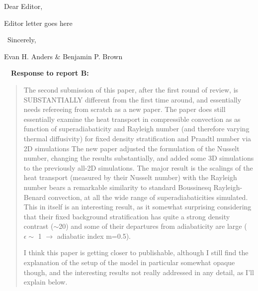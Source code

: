 \documentclass[aps, 11pt, singlecolumn]{revtex4-1} %
\begin{document}
\noindent
Dear Editor,
$\,$\newline

\newenvironment{myquotation}{
\begin{quotation}
\itshape
}{ 
\end{quotation}
}

\begin{singlespace}
Editor letter goes here

$\,$\newline
\noindent
Sincerely,

Evan H. Anders \& Benjamin P. Brown




$\,$
\newline
$\,$
\newline
\noindent
\Large{\textbf{Response to report B:}}\newline$\,$\newline\indent

\begin{myquotation}

The second submission of this paper, after the first round of review,
is SUBSTANTIALLY different from the first time around, and essentially
needs refereeing from scratch as a new paper. The paper does still
essentially examine the heat transport in compressible convection as
as function of superadiabaticity and Rayleigh number (and therefore
varying thermal diffusivity) for fixed density stratification and
Prandtl number via 2D simulations The new paper adjusted the
formulation of the Nusselt number, changing the results substantially,
and added some 3D simulations to the previously all-2D simulations.
The major result is the scalings of the heat transport (measured by
their Nusselt number) with the Rayleigh number bears a remarkable
similarity to standard Boussinesq Rayleigh-Benard convection, at all
the wide range of superadiabaticities simulated. This in itself is an
interesting result, as it somewhat surprising considering that their
fixed background stratification has quite a strong density contrast
($\sim$20) and some of their departures from adiabaticity are large
($\epsilon \sim$ 1 $\rightarrow$ adiabatic index m=0.5).

I think this paper is getting closer to publishable, although I still
find the explanation of the setup of the model in particular somewhat
opaque though, and the interesting results not really addressed in any
detail, as I'll explain below.


\end{myquotation}
\end{singlespace}
\end{document}
